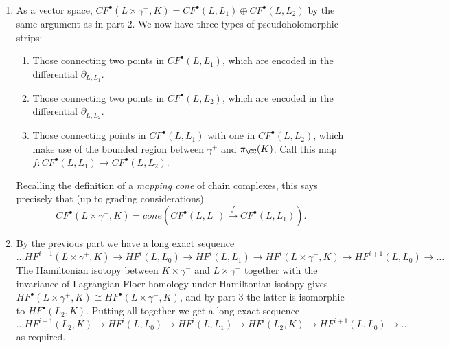 \begin{enumerate}
    \item As a vector space, $CF^\bullet(L\times\gamma^+,K)=CF^\bullet(L,L_1)\oplus CF^\bullet(L,L_2)$ by the same argument as in part 2. We now have three types of pseudoholomorphic strips:
    \begin{enumerate}
        \item Those connecting two points in $CF^\bullet(L,L_1)$, which are encoded in the differential $\partial_{L,L_1}$.
        \item Those connecting two points in $CF^\bullet(L,L_2)$, which are encoded in the differential $\partial_{L,L_2}$.
        \item Those connecting  points in $CF^\bullet(L,L_1)$ with one in $CF^\bullet(L,L_2)$, which make use of the bounded region between $\gamma^+$ and $\pi_\CC(K)$. Call this map $f:CF^\bullet(L,L_1)\to CF^\bullet(L,L_2)$.
    \end{enumerate}
    Recalling the definition of a {\it mapping cone} of chain complexes, this says precisely that (up to grading considerations)
    \[
    CF^\bullet(L\times\gamma^+,K)=cone(CF^\bullet(L,L_0)\xrightarrow{f} CF^\bullet(L,L_1)).
    \]
    
    \item By the previous part we have a long exact sequence
    \[
    \dots HF^{i-1}(L\times\gamma^+,K)\to HF^i(L,L_0) \to HF^i(L,L_1) \to HF^i(L\times\gamma^-,K) \to HF^{i+1} (L,L_0)\to\dots
    \]
    The Hamiltonian isotopy between $K\times\gamma^-$ and $L\times\gamma^+$ together with the invariance of Lagrangian Floer homology under Hamiltonian isotopy gives $HF^\bullet(L\times\gamma^+,K)\cong HF^\bullet(L\times\gamma^-,K)$, and by part 3 the latter is isomorphic to $HF^\bullet(L_2,K)$. Putting all together we get a long exact sequence
    \[
    \dots HF^{i-1}(L_2,K)\to HF^i(L,L_0) \to HF^i(L,L_1) \to HF^i(L_2,K) \to HF^{i+1} (L,L_0)\to\dots
    \]
    as required.
    \end{enumerate}
    